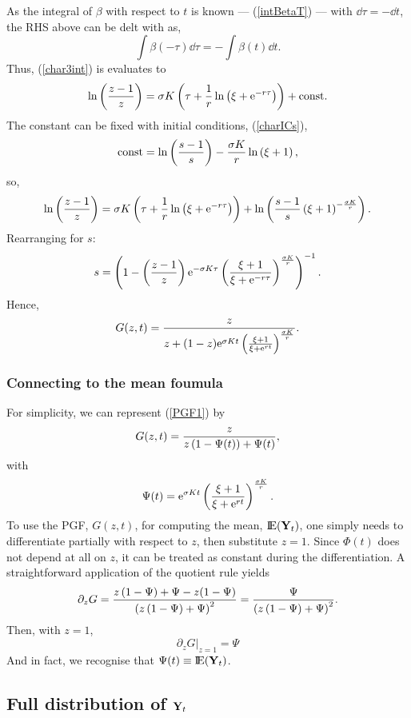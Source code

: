 As the integral of $\beta$ with respect to $t$ is known --- (\ref{intBetaT}) --- with $\dd \tau = -\dd t$, the RHS above can be delt with as,
$$\int \beta(-\tau)\dd \tau = - \int \beta(t) \dd t.$$
Thus, (\ref{char3int}) is evaluates to
$$\ln\left(\frac{z-1}{z}\right) =   \sigma K \left(\tau + \frac{1}{r}\ln\left(\xi + {\rm e}^{-r\tau}\right)  \right) + \text{const}.$$
The constant can be fixed with initial conditions, (\ref{charICs}),
$$\text{const} = \ln\left(\frac{s-1}{s}\right) - \frac{\sigma K }{r} \ln\left(\xi + 1\right),$$ 
so,
$$\ln\left(\frac{z-1}{z}\right) =   \sigma K \left(\tau + \frac{1}{r}\ln\left(\xi + {\rm e}^{-r\tau}\right)  \right) +  \ln\left(\frac{s-1}{s}\left(\xi + 1\right)^{-\frac{\sigma K }{r} } \right).$$
Rearranging for $s$:
$$s = \left(1 - \left(\frac{z-1}{z}\right) {\rm e}^{-\sigma K \tau} \left(\frac{\xi + 1}{\xi + {\rm e}^{-r\tau}}\right)^{\frac{\sigma K}{r}} \right)^{-1}.$$
Hence, 
\begin{equation}
\label{PGF1} 
G(z, t) = \frac{z}{z + (1 - z) {\rm e}^{\sigma K t} \left(\frac{\xi + 1}{\xi + {\rm e}^{rt}}\right)^{\frac{\sigma K}{r}}}.
\end{equation}

\subsubsection*{Connecting to the mean foumula}
For simplicity, we can represent (\ref{PGF1}) by 
$$G(z, t) = \frac{z}{z\left(1 - \Psi(t)\right) + \Psi(t)},$$
with
$$\Psi(t) =  {\rm e}^{\sigma K t} \left(\frac{\xi + 1}{\xi + {\rm e}^{rt}}\right)^{\frac{\sigma K}{r}}.$$
To use the PGF, $G(z,t)$, for computing the mean, ${\rm I}\!{\rm E}({{\bf Y}_t})$, one simply needs to differentiate partially with respect to $z$, then substitute $z=1$. Since $\Phi(t)$ does not depend at all on $z$, it can be treated as constant during the differentiation. A straightforward application of the quotient rule yields
$$\partial_z G = \frac{z\left(1 - \Psi\right)  + \Psi  - z(1 - \Psi) }{\left( z\left(1 - \Psi\right) + \Psi\right)^2} = \frac{\Psi}{\left( z\left(1 - \Psi\right) + \Psi\right)^2}.$$
Then, with $z = 1$,
$$\partial_z G |_{z=1} = \Psi$$
And in fact, we recognise that $\Psi(t) \equiv {\rm I}\!{\rm E}({{\bf Y}_t})$. 



\subsection{Full distribution of ${{\bf Y}_t}$}

